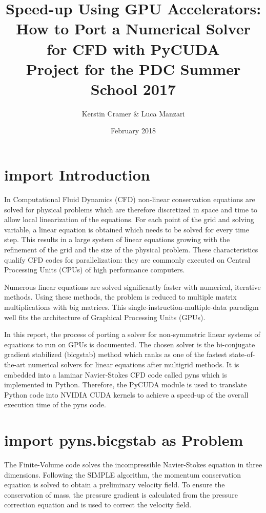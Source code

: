 \documentclass[11pt]{article}
\title{Speed-up Using GPU Accelerators:  \\ 
How to Port a Numerical Solver for CFD with PyCUDA \\
\vspace*{0.75cm}\large Project for the PDC Summer School 2017}
\author{Kerstin Cramer \& Luca Manzari}
\date{February 2018}
\begin{document}
\maketitle
\tableofcontents
\newpage
\section{import Introduction}

In Computational Fluid Dynamics (CFD) non-linear conservation equations are solved for physical problems which are therefore discretized in space and time to allow local linearization of the equations. For each point of the grid and solving variable, a linear equation is obtained which needs to be solved for every time step. This results in a large system of linear equations growing with the refinement of the grid and the size of the physical problem. These characteristics qualify CFD codes for parallelization: they are commonly executed on Central Processing Units (CPUs) of high performance computers. 

Numerous linear equations are solved significantly faster with numerical, iterative methods. Using these methods, the problem is reduced to multiple matrix multiplications with big matrices. This single-instruction-multiple-data paradigm well fits the architecture of Graphical Processing Units (GPUs).

In this report, the process of porting a solver for non-symmetric linear systems of equations to run on GPUs is documented. The chosen solver is the bi-conjugate gradient stabilized (bicgstab) method which ranks as one of the fastest state-of-the-art numerical solvers for linear equations after multigrid methods. It is embedded into a laminar Navier-Stokes CFD code called pyns which is implemented in Python. Therefore, the PyCUDA module is used to translate Python code into NVIDIA CUDA kernels to achieve a speed-up of the overall execution time of the pyns code.

\section{import pyns.bicgstab as Problem}

The Finite-Volume code solves the incompressible Navier-Stokes equation in three dimensions. Following the SIMPLE algorithm, the momentum conservation equation is solved to obtain a preliminary velocity field. To ensure the conservation of mass, the pressure gradient is calculated from the pressure correction equation and is used to correct the velocity field. 
\end{document}
